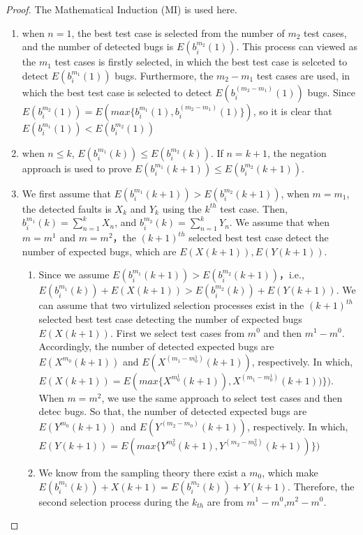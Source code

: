 \documentclass[10pt,journal,letterpaper,compsoc]{IEEEtran}
\begin{document}
\begin{CJK}{UTF8}{gkai}
\begin{proof}
The Mathematical Induction (MI) is used here. 
\begin{enumerate}
\item when $n=1$, the best test case is selected from the number of $m_2$ test cases,
    and the number of detected bugs is $E(b_i^{m_2}(1))$. This process can viewed as
    the $m_1$ test cases is firstly selected, in which the best test case is selceted to  
    detect  $E(b_i^{m_1}(1))$  bugs. Furthermore, the  $m_2-m_1$ test cases are used, 
    in which the best test case is selected to detect $E(b_i^{(m_2-m_1)}(1))$ bugs. 
    Since $E(b_i^{m_2}(1))=E(max\{b_i^{m_1}(1),b_i^{(m_2-m_1)}(1)\})$, so it is clear that
    $E(b_i^{m_1}(1)) < E(b_i^{m_2}(1))$
\item when $n\leq k$, $E(b_i^{m_1}(k)) \leq E(b_i^{m_2}(k))$. If $n=k+1$,
    the negation approach is used to prove $E(b_i^{m_1}(k+1)) \leq E(b_i^{m_2}(k+1))$.
\item We first assume that $E(b_i^{m_1}(k+1)) > E(b_i^{m_2}(k+1))$, when $m=m_1$,
    the detected faults is $X_k$ and $Y_k$ using the $k^{th}$ test case. 
    Then, $b_i^{m_1}(k)=\sum_{n=1}^{k}X_n$, and $b_i^{m_2}(k)=\sum_{n=1}^{k}Y_n$.
    We assume that when $m=m^1$ and $m=m^2$，the $(k+1)^{th}$ selected best test case detect the number of expected bugs,
    which are $E(X(k+1)),E(Y(k+1))$. 
    \begin{enumerate}
    \item Since we assume $E(b_i^{m_1}(k+1)) > E(b_i^{m_2}(k+1))$，i.e., 
          $E(b_i^{m_1}(k))+E(X(k+1)) > E(b_i^{m_2}(k))+E(Y(k+1))$. 
          We can assume that two virtulized selection processes exist in the $(k+1)^{th}$ selected best test case detecting the number of expected bugs $E(X(k+1))$.
          First we select test cases from $m^0$ and then $ m^1-m^0 $. Accordingly, the number of detected expected bugs are $E(X^{m_0}(k+1))$ and $E(X^{(m_1-m^1_0)}(k+1))$, respectively.
          In which, $E(X(k+1))=E(max \{X^{m^1_0}(k+1)),X^{(m_1-m^1_0)}(k+1))\} )$. 
          When $m=m^2$, we use the same approach to select test cases and then detec bugs. So that, 
          the number of detected expected bugs are $E(Y^{m_0}(k+1))$ and $E(Y^{(m_2-m_0)}(k+1))$, respectively.
          In which, 
          $E(Y(k+1))=E(max \{Y^{m^2_0}(k+1),Y^{(m_2-m^2_0)}(k+1))\})$ 
    \item We know from the sampling theory there exist a $m_0$, which make   
          $E(b_i^{m_1}(k))+X(k+1) = E(b_i^{m_2}(k))+Y(k+1)$. Therefore, the second selection process during the $k_{th}$ are from $m^1-m^0$,$m^2-m^0$.

\end{enumerate}
\end{enumerate}
\end{proof}
\end{CJK}
\end{document}
